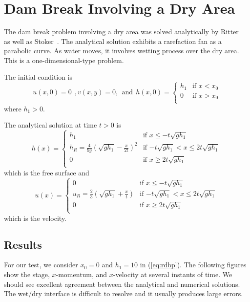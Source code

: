 
\section{Dam Break Involving a Dry Area}

The dam break problem involving a dry area was solved analytically by Ritter~\cite{Ritter1892} as well as Stoker~\cite{Stoker1948, Stoker1957}. The analytical solution exhibits a rarefaction fan as a parabolic curve. As water moves, it involves wetting process over the dry area. This is a one-dimensional-type problem. 

The initial condition is
\begin{equation} \label{eq:rdbp}
u(x,0)=0~~, v(x,y)=0, ~~\textrm{and}~~
h(x,0) = \left\{ \begin{array}{ll}
h_1 & \textrm{if $x < x_0$}\\
0 & \textrm{if $x > x_0$}\\
\end{array} \right.
\end{equation}
where $h_1>0$. 

The analytical solution at time $t>0$ is~\cite{Ritter1892, Stoker1948, Stoker1957}
\begin{equation} \label{eq:h_sol_dry}
h(x) = \left\{ \begin{array}{ll}
h_1 & \textrm{if $x \leq -t \sqrt{gh_1}$}\\
h_R=\frac{4}{9g}(\sqrt{gh_1}-\frac{x}{2t})^2 & \textrm{if $-t \sqrt{gh_1} <x \leq 2t\sqrt{gh_1}$}\\
0 & \textrm{if $x \geq 2t\sqrt{gh_1}$}\\
\end{array} \right.
\end{equation}
which is the free surface and
\begin{equation} \label{eq:u_sol_dry}
u(x) = \left\{ \begin{array}{ll}
0 & \textrm{if $x \leq -t \sqrt{gh_1}$}\\
u_R=\frac{2}{3}(\sqrt{gh_1}+\frac{x}{t}) & \textrm{if $-t \sqrt{gh_1} <x \leq 2t\sqrt{gh_1}$}\\
0 & \textrm{if $x \geq 2t\sqrt{gh_1}$}\\
\end{array} \right.
\end{equation}
which is the velocity.



\subsection{Results}
For our test, we consider $x_0=0$ and $h_1=10$ in (\ref{eq:rdbp}).
The following figures show the stage, $x$-momentum, and $x$-velocity at several instants of time. We should see excellent agreement between the analytical and numerical solutions. The wet/dry interface is difficult to resolve and it usually produces large errors.

